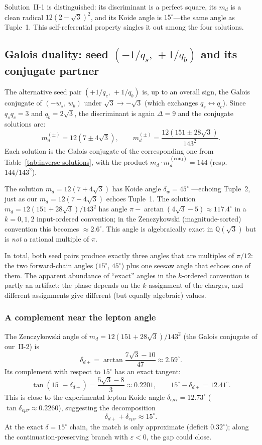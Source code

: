 \documentclass[11pt]{article}
\begin{document}
\noindent
Solution~II-1 is distinguished: its discriminant is a perfect square,
its $m_d$ is a clean radical $12(2-\sqrt3)^2$, and its Koide angle
is $15^\circ$---the same angle as Tuple~1.  This self-referential
property singles it out among the four solutions.

\subsection{Galois duality: seed $(-1/q_s,\,+1/q_b)$ and its conjugate partner}

The alternative seed pair $(+1/q_c,\,+1/q_b)$ is, up to an overall sign, the
Galois conjugate
of $(-w_s,\,w_b)$ under $\sqrt3 \to -\sqrt3$ (which exchanges
$q_s\leftrightarrow q_c$). Since $q_s q_c = 3$ and $q_b = 2\sqrt3$,
the discriminant is again $\Delta = 9$ and the conjugate solutions are:
\[
  m_d^{(\pm)} = 12(7 \pm 4\sqrt3),
  \qquad
  m_d^{(\pm)} = \frac{12(151\pm 28\sqrt3)}{143^2}.
\]
Each solution is the Galois conjugate of the corresponding one from
Table~\ref{tab:inverse-solutions}, with the product
$m_d \cdot m_d^{(\text{conj})} = 144$
(resp.\ $144/143^2$).

The solution $m_d = 12(7+4\sqrt3)$ has Koide angle $\delta_w = 45^\circ$
---echoing Tuple~2, just as our $m_d = 12(7-4\sqrt3)$ echoes Tuple~1.
The solution $m_d = 12(151+28\sqrt3)/143^2$ has angle
$\pi - \arctan(4\sqrt3-5)\approx 117.4^\circ$ in a
$k=0,1,2$ input-ordered convention; in the Zenczykowski (magnitude-sorted)
convention this becomes $\approx 2.6^\circ$.  This angle is algebraically
exact in $\mathbb{Q}(\sqrt3)$ but is \emph{not} a rational multiple of
$\pi$.

In total, both seed pairs produce exactly three angles that are multiples
of $\pi/12$: the two forward-chain angles ($15^\circ$, $45^\circ$) plus
one seesaw angle that echoes one of them.  The apparent abundance of
``exact'' angles in the $k$-ordered convention is partly an artifact:
the phase depends on the $k$-assignment of the charges, and different
assignments give different (but equally algebraic) values.

\subsubsection{A complement near the lepton angle}\label{sec:galois-complement}

The Zenczykowski angle of $m_d = 12(151+28\sqrt3)/143^2$
(the Galois conjugate of our~II-2) is
\[
  \delta_{d+} = \arctan\frac{7\sqrt3-10}{47} \approx 2.59^\circ.
\]
Its complement with respect to $15^\circ$ has an exact tangent:
\[
  \tan(15^\circ - \delta_{d+}) = \frac{5\sqrt3-8}{3}\approx 0.2201,
  \qquad 15^\circ - \delta_{d+} = 12.41^\circ.
\]
This is close to the experimental lepton Koide angle
$\delta_{e\mu\tau} = 12.73^\circ$
($\tan\delta_{e\mu\tau}\approx 0.2260$), suggesting the decomposition
\[
  \delta_{d+} + \delta_{e\mu\tau} \approx 15^\circ.
\]
At the exact $\delta=15^\circ$ chain, the match is only approximate
(deficit $0.32^\circ$); along the continuation-preserving branch with
$\varepsilon < 0$, the gap
could close.
\end{document}
